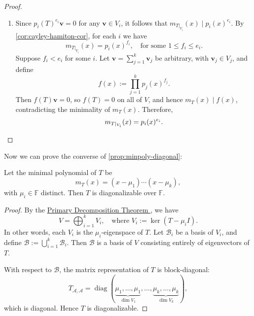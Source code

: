 \begin{proof}
\begin{enumerate}
    Apply \(b_i(T) q_i(T)\) to both sides of \eqref{eq:zero-sum}:
    \[
    \mathbf{0} = b_i(T) q_i(T) (\mathbf{v}_1' + \cdots + \mathbf{v}_k') = \sum_{j=1}^k b_i(T) q_i(T) \mathbf{v}_j'.
    \]
    But for \(j \neq i\), \(q_i(T) \mathbf{v}_j' = 0\), since \(p_j(x)^{e_j} \mid q_i(x)\). So:
    \[
    \mathbf{0} = b_i(T) q_i(T) \mathbf{v}_i' = \mathbf{v}_i' \quad \Rightarrow \quad \mathbf{v}_i' = 0.
    \]
    Since this holds for each \(i\), the sum is direct:
    \begin{equation}
        V = V_1 \oplus \cdots \oplus V_k. \label{eq:direct-sum}
    \end{equation}

    \item Since \(p_i(T)^{e_i} \mathbf{v} = 0\) for any \(\mathbf{v} \in V_i\), it follows that \(m_{T|_{V_i}}(x) \mid p_i(x)^{e_i}\). By \autoref{cor:cayley-hamiton-cor}, for each \(i\) we have
    \[
    m_{T|_{V_i}}(x) = p_i(x)^{f_i}, \quad \text{for some } 1 \leq f_i \leq e_i.
    \]
    Suppose \(f_i < e_i\) for some \(i\). Let \(\mathbf{v} = \sum_{j=1}^k \mathbf{v}_j\) be arbitrary, with \(\mathbf{v}_j \in V_j\), and define
    \[
    f(x) := \prod_{j=1}^k p_j(x)^{f_j}.
    \]
    Then \(f(T) \mathbf{v} = 0\), so \(f(T) = 0\) on all of \(V\), and hence \(m_T(x) \mid f(x)\), contradicting the minimality of \(m_T(x)\). Therefore,
    \[
    m_{T|_{V_i}}(x) = p_i(x)^{e_i}. \qedhere
    \]
\end{enumerate}
\end{proof}

Now we can prove the converse of \autoref{prop:minpoly-diagonal}:
\begin{corollary}\label{cor:diag-criterion}
Let the minimal polynomial of \(T\) be
\[
m_T(x) = (x - \mu_1) \cdots (x - \mu_k),
\]
with \(\mu_i \in \mathbb{F}\) distinct. Then \(T\) is diagonalizable over \(\mathbb{F}\). 
\end{corollary}

\begin{proof}
By the \hyperref[thm:primary-decomposition]{Primary Decomposition Theorem }, we have
\[
V = \bigoplus_{i = 1}^{k} V_i, \quad \text{where } V_i := \ker(T - \mu_i I).
\]
In other words, each \(V_i\) is the \(\mu_i\)-eigenspace of \(T\). Let \(\mathcal{B}_i\) be a basis of \(V_i\), and define \(\mathcal{B} := \bigcup_{i = 1}^k \mathcal{B}_i\). Then \(\mathcal{B}\) is a basis of \(V\) consisting entirely of eigenvectors of \(T\).

With respect to \(\mathcal{B}\), the matrix representation of \(T\) is block-diagonal:
\[
T_{\mathcal{A}, \mathcal{A}} = \operatorname{diag}(\underbrace{\mu_1, \dots, \mu_1}_{\dim V_1}, \dots, \underbrace{\mu_k, \dots, \mu_k}_{\dim V_k}),
\]
which is diagonal. Hence \(T\) is diagonalizable.
\end{proof}

